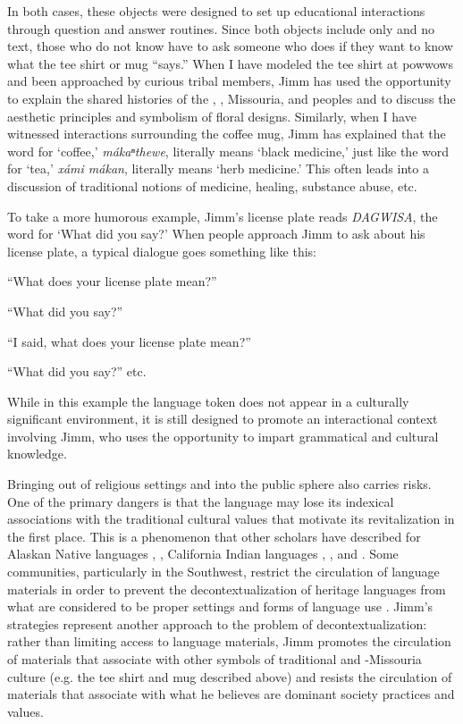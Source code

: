 \documentclass[output=paper]{LSP/langsci}
\begin{document}
In both cases, these objects were designed to set up educational interactions through question and answer routines. Since both objects include only  and no  text, those who do not know  have to ask someone who does if they want to know what the tee shirt or mug ``says.'' When I have modeled the tee shirt at powwows and been approached by curious tribal members, Jimm has used the opportunity to explain the shared histories of the , , Missouria, and  peoples and to discuss the aesthetic principles and symbolism of floral designs. Similarly, when I have witnessed interactions surrounding the coffee mug, Jimm has explained that the  word for `coffee,' \emph{mákaⁿthewe}, literally means `black medicine,' just like the word for `tea,' \emph{xámi mákan}, literally means `herb medicine.' This often leads into a discussion of traditional notions of medicine, healing, substance abuse, etc.

To take a more humorous example, Jimm's license plate reads \emph{DAGWISA}, the  word for `What did you say?' When people approach Jimm to ask about his license plate, a typical dialogue goes something like this:

	``What does your license plate mean?''
	
	``What did you say?''
	
	``I said, what does your license plate mean?''
	
	``What did you say?'' etc.
	
While in this example the  language token does not appear in a culturally significant environment, it is still designed to promote an interactional context involving Jimm, who uses the opportunity to impart grammatical and cultural knowledge.

Bringing  out of religious settings and into the public sphere also carries risks. One of the primary dangers is that the language may lose its indexical associations with the traditional cultural values that motivate its revitalization in the first place. This is a phenomenon that other scholars have described for Alaskan Native languages \citep{DauenhauerDauenhauer1998},  \citep{Nevins2013, Samuels2006}, California Indian languages \citep{Ahlers2006},  \citep{Meek2010}, and  \citep{Perley2011}. Some communities, particularly in the Southwest, restrict the circulation of language materials in order to prevent the decontextualization of heritage languages from what are considered to be proper settings and forms of language use \citep{Debenport2015, Whiteley2003}. Jimm's  strategies represent another approach to the problem of decontextualization: rather than limiting access to language materials, Jimm promotes the circulation of materials that associate  with other symbols of traditional  and -Missouria culture (e.g. the tee shirt and mug described above) and resists the circulation of materials that associate  with what he believes are dominant society practices and values.
\end{document}
